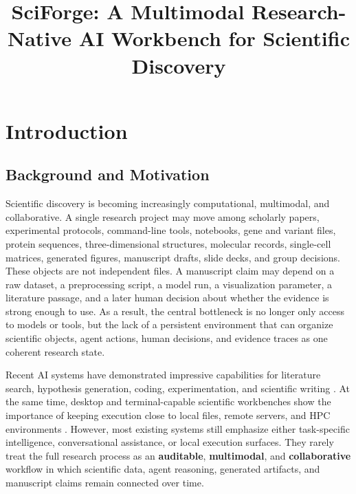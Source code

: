 \documentclass[sn-basic,Numbered,pdflatex]{sn-jnl}
\title[SciForge: Multimodal Research-Native AI Workbench]{SciForge: A Multimodal Research-Native AI Workbench for Scientific Discovery}
\author*[1]{\fnm{Author} \sur{Names}}\email{author@example.com}
\affil*[1]{\orgdiv{Institute}, \orgname{University}, \orgaddress{\city{City}, \country{Country}}}
\begin{document}
\maketitle

\vspace{-12pt}
\section{Introduction}

\subsection{Background and Motivation}

Scientific discovery is becoming increasingly computational, multimodal, and collaborative. A single research project may move among scholarly papers, experimental protocols, command-line tools, notebooks, gene and variant files, protein sequences, three-dimensional structures, molecular records, single-cell matrices, generated figures, manuscript drafts, slide decks, and group decisions. These objects are not independent files. A manuscript claim may depend on a raw dataset, a preprocessing script, a model run, a visualization parameter, a literature passage, and a later human decision about whether the evidence is strong enough to use. As a result, the central bottleneck is no longer only access to models or tools, but the lack of a persistent environment that can organize scientific objects, agent actions, human decisions, and evidence traces as one coherent research state.

Recent AI systems have demonstrated impressive capabilities for literature search, hypothesis generation, coding, experimentation, and scientific writing \cite{futureHousePlatform2025,googleCoScientist2025,sakanaAIScientist2024,agentLaboratory2025,paperQA2024}. At the same time, desktop and terminal-capable scientific workbenches show the importance of keeping execution close to local files, remote servers, and HPC environments \cite{anthropicClaudeScience2026,omicOSOverview2026,omicsClaw2026,operonGitHub2026,claudePrism2026}. However, most existing systems still emphasize either task-specific intelligence, conversational assistance, or local execution surfaces. They rarely treat the full research process as an \textbf{auditable}, \textbf{multimodal}, and \textbf{collaborative} workflow in which scientific data, agent reasoning, generated artifacts, and manuscript claims remain connected over time.
\end{document}
